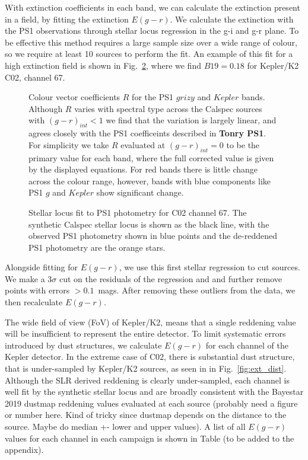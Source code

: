 \documentclass{aastex63}
\begin{document}
With extinction coefficients in each band, we can calculate the extinction present in a field, by fitting the extinction $E(g-r)$. We calculate the extinction with the PS1 observations through stellar locus regression in the g-i and g-r plane. To be effective this method requires a large sample size over a wide range of colour, so we require at least 10 sources to perform the fit. An example of this fit for a high extinction field is shown in Fig.~\ref{fig:av_fit}, where we find $B19 = 0.18$ for Kepler/K2 C02, channel 67.

\begin{figure}
\caption{Colour vector coefficients $R$ for the PS1 $grizy$ and $Kepler$ bands. Although $R$ varies with spectral type across the Calspec sources with $(g-r)_{int} < 1$ we find that the variation is largely linear, and agrees closely with the PS1 coefficeints described in \textbf{Tonry PS1}. For simplicity we take $R$ evaluated at ${(g-r)_{int} =0}$ to be the primary value for each band, where the full corrected value is given by the displayed equations. For red bands there is little change across the colour range, however, bands with blue components like PS1 $g$ and $Kepler$ show significant change. \label{fig:R_fits}}
\end{figure}

\begin{figure}
\caption{Stellar locus fit to PS1 photometry for C02 channel 67. The synthetic Calspec stellar locus is shown as the black line, with the observed PS1 photometry shown in blue points and the de-reddened PS1 photometry are the orange stars. \label{fig:av_fit}}
\end{figure}

Alongside fitting for $E(g-r)$, we use this first stellar regression to cut sources. We make a $3\sigma$ cut  on the residuals of the regression and and further remove points with errors $>0.1$~mags. After removing these outliers from the data, we then recalculate $E(g-r)$.


The wide field of view (FoV) of Kepler/K2, means that a single reddening value will be insufficient to represent the entire detector. To limit systematic errors introduced by dust structures, we calculate $E(g-r)$ for each channel of the Kepler detector. In the extreme case of C02, there is substantial dust structure, that is under-sampled by Kepler/K2 sources, as seen in in Fig.~\ref{fig:ext_dist}. Although the SLR derived reddening is clearly under-sampled, each channel is well fit by the synthetic stellar locus and are broadly consistent with the Bayestar 2019 dustmap reddening values evaluated at each source (probably need a figure or number here. Kind of tricky since dustmap depends on the distance to the source. Maybe do median +- lower and upper values). A list of all $E(g-r)$ values for each channel in each campaign is shown in Table (to be added to the appendix).
\end{document}
